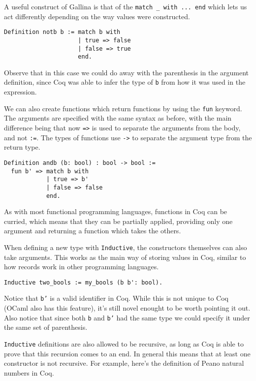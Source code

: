 A useful construct of Gallina is that of the 
\texttt{match _ with ... end} which lets us act differently depending on the way values were
constructed.

\begin{verbatim}
Definition notb b := match b with 
                     | true => false
                     | false => true
                     end.
\end{verbatim}

Observe that in this case we could do away with the parenthesis in the argument definition, since Coq was
able to infer the type of \texttt{b} from how it was used in the expression.

We can also create functions which return functions by using the \texttt{fun} keyword. The arguments are specified with the same syntax as before, with the main difference being that now \texttt{=>} is used to separate the arguments from the body, and not \texttt{:=}. The
types of functions use \texttt{->} to separate the argument type from the return type.

\begin{verbatim}
Definition andb (b: bool) : bool -> bool :=
  fun b' => match b with 
            | true => b'
            | false => false
            end.
\end{verbatim}

As with most functional programming languages, functions in Coq can be curried, which means that they
can be partially applied, providing only one argument and returning a function which takes the others.

When defining a new type with \texttt{Inductive}, the constructors themselves can also take 
arguments. This works as the main way of storing values in Coq, similar to how records work in other
programming languages.

\begin{verbatim}
Inductive two_bools := my_bools (b b': bool).
\end{verbatim}

Notice that \texttt{b'} is a valid identifier in Coq. While this is not unique to Coq (OCaml also
has this feature), it's still novel enought to be worth pointing it out. Also notice that since both
\texttt{b} and  \texttt{b'} had the same type we could specify it under the same set of
parenthesis.

\texttt{Inductive} definitions are also allowed to be recursive, as long as Coq is able to prove
that this recursion comes to an end. In general this means that at least one constructor is not 
recursive. For example, here's the definition of Peano natural numbers in Coq.

